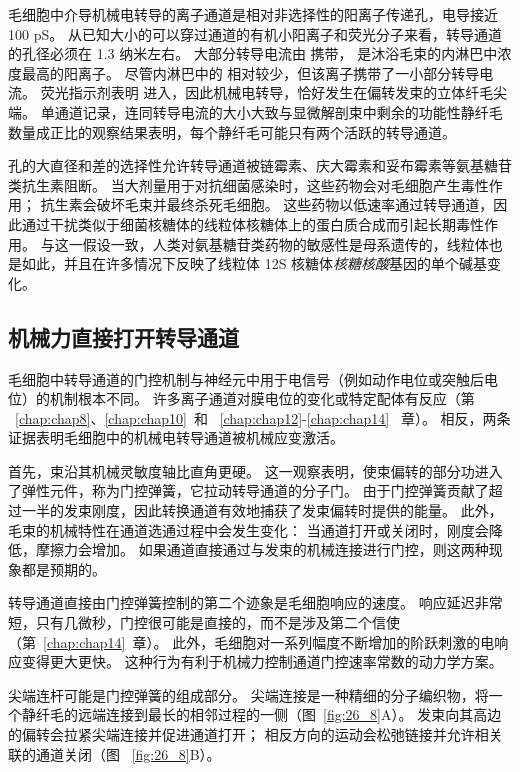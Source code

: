 毛细胞中介导机械电转导的离子通道是相对非选择性的阳离子传递孔，电导接近 100 pS。
从已知大小的可以穿过通道的有机小阳离子和荧光分子来看，转导通道的孔径必须在 1.3 纳米左右。
大部分转导电流由  携带， 是沐浴毛束的内淋巴中浓度最高的阳离子。
尽管内淋巴中的  相对较少，但该离子携带了一小部分转导电流。
荧光指示剂表明  进入，因此机械电转导，恰好发生在偏转发束的立体纤毛尖端。
单通道记录，连同转导电流的大小大致与显微解剖束中剩余的功能性静纤毛数量成正比的观察结果表明，每个静纤毛可能只有两个活跃的转导通道。


孔的大直径和差的选择性允许转导通道被链霉素、庆大霉素和妥布霉素等氨基糖苷类抗生素阻断。
当大剂量用于对抗细菌感染时，这些药物会对毛细胞产生毒性作用；
抗生素会破坏毛束并最终杀死毛细胞。
这些药物以低速率通过转导通道，因此通过干扰类似于细菌核糖体的线粒体核糖体上的蛋白质合成而引起长期毒性作用。
与这一假设一致，人类对氨基糖苷类药物的敏感性是母系遗传的，线粒体也是如此，并且在许多情况下反映了线粒体 12S 核糖体\textit{核糖核酸}基因的单个碱基变化。



\subsection{机械力直接打开转导通道}

毛细胞中转导通道的门控机制与神经元中用于电信号（例如动作电位或突触后电位）的机制根本不同。
许多离子通道对膜电位的变化或特定配体有反应（第 ~\ref{chap:chap8}、\ref{chap:chap10}~和 ~\ref{chap:chap12}-\ref{chap:chap14}~ 章）。
相反，两条证据表明毛细胞中的机械电转导通道被机械应变激活。


首先，束沿其机械灵敏度轴比直角更硬。
这一观察表明，使束偏转的部分功进入了弹性元件，称为门控弹簧，它拉动转导通道的分子门。
由于门控弹簧贡献了超过一半的发束刚度，因此转换通道有效地捕获了发束偏转时提供的能量。
此外，毛束的机械特性在通道选通过程中会发生变化：
当通道打开或关闭时，刚度会降低，摩擦力会增加。
如果通道直接通过与发束的机械连接进行门控，则这两种现象都是预期的。


转导通道直接由门控弹簧控制的第二个迹象是毛细胞响应的速度。
响应延迟非常短，只有几微秒，门控很可能是直接的，而不是涉及第二个信使（第~\ref{chap:chap14}~章）。
此外，毛细胞对一系列幅度不断增加的阶跃刺激的电响应变得更大更快。
这种行为有利于机械力控制通道门控速率常数的动力学方案。


尖端连杆可能是门控弹簧的组成部分。
尖端连接是一种精细的分子编织物，将一个静纤毛的远端连接到最长的相邻过程的一侧（图~\ref{fig:26_8}A）。
发束向其高边的偏转会拉紧尖端连接并促进通道打开； 相反方向的运动会松弛链接并允许相关联的通道关闭（图 ~\ref{fig:26_8}B）。


